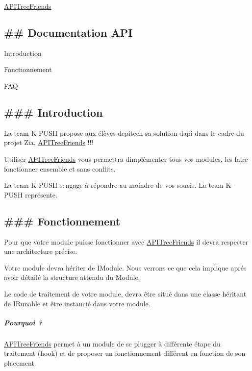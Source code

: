 \hyperlink{namespace_a_p_i_tree_friends}{A\+P\+I\+Tree\+Friends}

\subsection*{\#\# Documentation A\+P\+I }


\begin{DoxyItemize}
\item Introduction
\item Fonctionnement
\item F\+A\+Q
\end{DoxyItemize}

\subsection*{\#\#\# Introduction }

La team K-\/\+P\+U\+S\+H propose aux élèves d\textquotesingle{}epitech sa solution d\textquotesingle{}api dans le cadre du projet Zia, \hyperlink{namespace_a_p_i_tree_friends}{A\+P\+I\+Tree\+Friends} !!!

Utiliser \hyperlink{namespace_a_p_i_tree_friends}{A\+P\+I\+Tree\+Friends} vous permettra d\textquotesingle{}implémenter tous vos modules, les faire fonctionner ensemble et sans conflits.

La team K-\/\+P\+U\+S\+H s\textquotesingle{}engage à répondre au moindre de vos soucis. La team K-\/\+P\+U\+S\+H représente.

\subsection*{\#\#\# Fonctionnement }

Pour que votre module puisse fonctionner avec \hyperlink{namespace_a_p_i_tree_friends}{A\+P\+I\+Tree\+Friends} il devra respecter une architecture précise.

Votre module devra hériter de I\+Module. Nous verrons ce que cela implique aprés avoir détailé la structure attendu du Module.

Le code de traitement de votre module, devra être situé dans une classe héritant de I\+Runable et être instancié dans votre module.

\subparagraph*{Pourquoi ?}

\hyperlink{namespace_a_p_i_tree_friends}{A\+P\+I\+Tree\+Friends} permet à un module de se plugger à différente étape du traitement (hook) et de proposer un fonctionnement différent en fonction de son placement.

